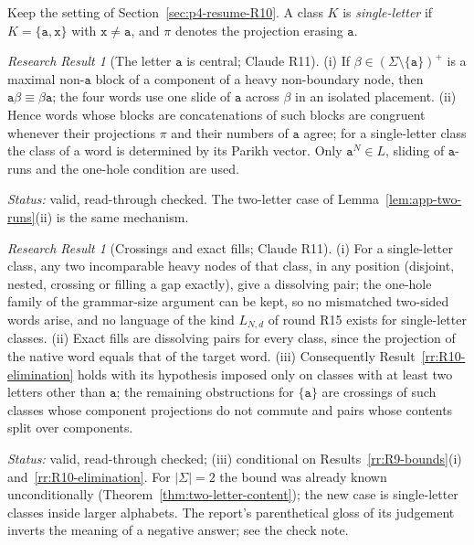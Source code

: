 \documentclass[11pt]{article}
\numberwithin{equation}{section}
\theoremstyle{plain}
\theoremstyle{definition}
\theoremstyle{remark}
\newtheorem{rresult}[theorem]{Research Result}
\theoremstyle{plain}
\begin{document}
Keep the setting of Section~\ref{sec:p4-resume-R10}.  A class $K$ is \emph{single-letter} if
$K=\{\mathtt a,\mathtt x\}$ with $\mathtt x\ne\mathtt a$, and $\pi$ denotes the projection erasing
$\mathtt a$.

\begin{rresult}[The letter $\mathtt a$ is central; Claude R11]
\label{rr:R11-central}
(i) If $\beta\in(\Sigma\setminus\{\mathtt a\})^+$ is a maximal non-$\mathtt a$ block of a component
of a heavy non-boundary node, then $\mathtt a\beta\equiv\beta\mathtt a$; the four words use one
slide of $\mathtt a$ across $\beta$ in an isolated placement.  (ii) Hence words whose blocks are
concatenations of such blocks are congruent whenever their projections $\pi$ and their numbers
of $\mathtt a$ agree; for a single-letter class the class of a word is determined by its Parikh
vector.  Only $\mathtt a^N\in L$, sliding of $\mathtt a$-runs and the one-hole condition are used.
\end{rresult}
\noindent\emph{Status:} valid, read-through checked.  The two-letter case of
Lemma~\ref{lem:app-two-runs}(ii) is the same mechanism.

\begin{rresult}[Crossings and exact fills; Claude R11]
\label{rr:R11-pairs}
(i) For a single-letter class, any two incomparable heavy nodes of that class, in any position
(disjoint, nested, crossing or filling a gap exactly), give a dissolving pair; the one-hole family
of the grammar-size argument can be kept, so no mismatched two-sided words arise, and no
language of the kind $L_{N,d}$ of round R15 exists for single-letter classes.  (ii) Exact fills are
dissolving pairs for every class, since the projection of the native word equals that of the
target word.  (iii) Consequently Result~\ref{rr:R10-elimination} holds with its hypothesis imposed
only on classes with at least two letters other than $\mathtt a$; the remaining obstructions for
$\{\mathtt a\}$ are crossings of such classes whose component projections do not commute and pairs
whose contents split over components.
\end{rresult}
\noindent\emph{Status:} valid, read-through checked; (iii) conditional on
Results~\ref{rr:R9-bounds}(i) and~\ref{rr:R10-elimination}.  For $|\Sigma|=2$ the bound was already
known unconditionally (Theorem~\ref{thm:two-letter-content}); the new case is single-letter classes
inside larger alphabets.  The report's parenthetical gloss of its judgement inverts the meaning
of a negative answer; see the check note.
\end{document}

